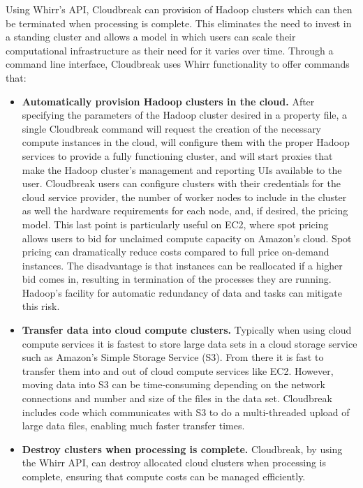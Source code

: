 Using Whirr's API, Cloudbreak can provision of Hadoop clusters which can then be terminated when processing is complete. This eliminates the need to invest in a standing cluster and allows a model in which users can scale their computational infrastructure as their need for it varies over time. Through a command line interface, Cloudbreak uses Whirr functionality to offer commands that:

\begin{itemize}
\item \textbf{Automatically provision Hadoop clusters in the cloud.} After specifying the parameters of the Hadoop cluster desired in a property file, a single Cloudbreak command will request the creation of the necessary compute instances in the cloud, will configure them with the proper Hadoop services to provide a fully functioning cluster, and will start proxies that make the Hadoop cluster's management and reporting UIs available to the user. Cloudbreak users can configure clusters with their credentials for the cloud service provider, the number of worker nodes to include in the cluster as well the hardware requirements for each node, and, if desired, the pricing model. This last point is particularly useful on EC2, where spot pricing allows users to bid for unclaimed compute capacity on Amazon's cloud. Spot pricing can dramatically reduce costs compared to full price on-demand instances. The disadvantage is that instances can be reallocated if a higher bid comes in, resulting in termination of the processes they are running. Hadoop's facility for automatic redundancy of data and tasks can mitigate this risk.

\item \textbf{Transfer data into cloud compute clusters.} Typically when using cloud compute services it is fastest to store large data sets in a cloud storage service such as Amazon's Simple Storage Service (S3). From there it is fast to transfer them into and out of cloud compute services like EC2. However, moving data into S3 can be time-consuming depending on the network connections and number and size of the files in the data set. Cloudbreak includes code which communicates with S3 to do a multi-threaded upload of large data files, enabling much faster transfer times.

\item \textbf{Destroy clusters when processing is complete.} Cloudbreak, by using the Whirr API, can destroy allocated cloud clusters when processing is complete, ensuring that compute costs can be managed efficiently.
\end{itemize}

